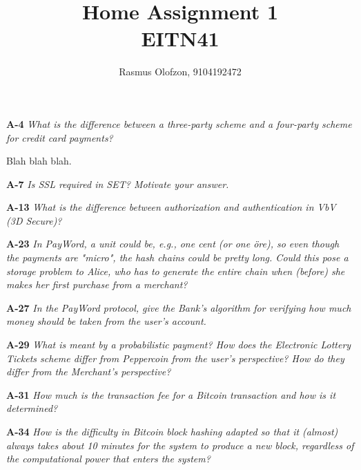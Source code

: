 \documentclass[a4paper]{article}
\title{Home Assignment 1 \\ EITN41}
\author{Rasmus Olofzon, 9104192472}
\date{}
\newcommand{\Q}[2]{
  \textbf{#1} \textit{#2}
 }
\newcommand{\A}[1]{ #1 }
\begin{document}
\maketitle

\Q{A-4} {What  is  the  difference  between  a  three-party  scheme  and  a  four-party  
scheme  for  credit  card  payments?}

\A{Blah blah blah.}

\Q{A-7} {Is SSL required in SET? Motivate your answer.}

\Q{A-13} {What is the difference between authorization and authentication in VbV 
(3D Secure)?}

\Q{A-23} {In  PayWord,  a  unit  could  be,  e.g.,  one  cent  (or  one  {\"o}re),  
so  even  though  the  payments  are  "micro", the hash chains could be pretty long.  
Could this pose a storage problem to Alice, who has to generate the entire chain when 
(before) she makes her  first purchase from a merchant?}

\Q{A-27} {In the PayWord protocol, give the Bank's algorithm for verifying how much money 
should be taken from the user's account.}

\Q{A-29} {What  is  meant  by  a  probabilistic  payment?   How  does  the  
Electronic  Lottery  Tickets  scheme  differ from Peppercoin from the user's perspective?
How do they differ from the Merchant's perspective?}

\Q{A-31} {How much is the transaction fee for a Bitcoin transaction and how is it 
determined?}

\Q{A-34} {How  is  the  difficulty  in  Bitcoin  block  hashing  adapted  so  that  it  
(almost)  always  takes  about  10 minutes for the system to produce a new block, 
regardless of the computational power that enters the system?}

\end{document}
